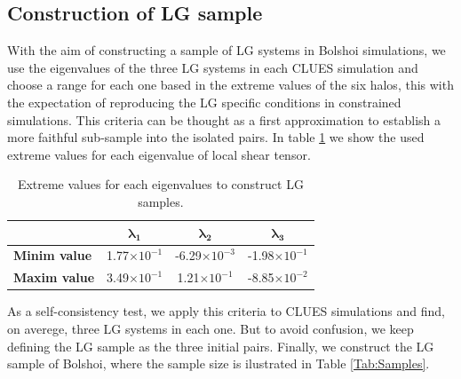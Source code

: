 \documentclass[usenatbib]{mn2e}
\newcommand{\bds}[1]{\boldsymbol{ #1 }}
\begin{document}
\subsection{Construction of LG sample}
\label{subsec:LG_construction}
With the aim of constructing a sample of LG systems in Bolshoi simulations, we use the eigenvalues of 
the three LG systems in each CLUES simulation and choose a range for each one based in the extreme values 
of the six halos, this with the expectation of reproducing the LG specific conditions in constrained 
simulations. This criteria can be thought as a first approximation to establish a more faithful sub-sample
into the isolated pairs. In table \ref{Tab:Lambdas_LG} we show the used extreme values for each eigenvalue
of local shear tensor.




\begin{table}
  \centering
  \begin{tabular}{l | c c c} \hline
	& $\bds{\lambda_{1}}$ & $\bds{\lambda_{2}}$  & $\bds{\lambda_{3}}$ \\ \hline
	\textbf{Minim value} & 1.77$\times 10^{-1}$ & -6.29$\times 10^{-3}$ & -1.98$\times 10^{-1}$ \\
	\textbf{Maxim value} & 3.49$\times 10^{-1}$ & 1.21$\times 10^{-1}$ & -8.85$\times 10^{-2}$ \\ \hline
  \end{tabular}
  \caption{Extreme values for each eigenvalues to construct LG samples.}
  \label{Tab:Lambdas_LG}
\end{table}

As a self-consistency test, we apply this criteria to CLUES simulations and find, on averege, three LG systems 
in each one. But to avoid confusion, we keep defining the LG sample as the three initial pairs. Finally, we
construct the LG sample of Bolshoi, where the sample size is ilustrated in Table \ref{Tab:Samples}.
\end{document}
